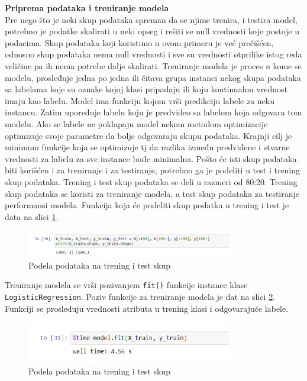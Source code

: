 \documentclass[a4paper,12pt]{report}
\begin{document}
\textbf{Priprema podataka i treniranje modela}\\

Pre nego što je neki skup podataka spreman da se njime trenira, i testira model, potrebno je podatke skalirati u neki opseg i rešiti se null vrednosti koje postoje u podacima. Skup podataka koji koristimo u ovom primeru je već prečišćen, odnosno skup podataka nema null vrednosti i sve su vrednosti otprilike istog reda veličine pa ih nema potrebe dalje skalirati. Treniranje modela je proces u kome se modelu, prosleđuje jedna po jedna ili čitava grupa instanci nekog skupa podataka sa labelama koje su oznake kojoj klasi pripadaju ili koju kontinualnu vrednost imaju kao labelu. Model ima funkciju kojom vrši predikciju labele za neku instancu. Zatim upoređuje labelu koju je predvideo sa labelom koja odgovara tom modelu. Ako se labele ne poklapaju model nekom metodom optimizacije optimizuje svoje parametre da bolje odgovaraju skupu podataka. Krajnji cilj je minimum funkcije koja se optimizuje tj da razlika između predviđene i stvarne vrednosti za labelu za sve instance bude minimalna. Pošto će isti skup podataka biti korišćen i za treniranje i za testiranje, potrebno ga je podeliti u test i trening skup podataka. Trening  i test skup podataka se deli u razmeri od 80:20. Trening skup podataka se koristi za treniranje modela, a test skup podataka za testiranje performansi modela. Funkcija koja će podeliti skup podatka u trening i test je data na slici \ref{fig:irissplit}.

\begin{figure}[h]
    \centering
    \includegraphics[width=0.8\textwidth]{iris_split_dataset.png}
    \caption{Podela podataka na trening i test skup}\label{fig:irissplit}
\end{figure}

Treniranje modela se vrši pozivanjem \texttt{fit()} funkcije instance klase \texttt{LogisticRegression}. Poziv funkcije za treniranje modela je dat na slici \ref{fig:logisticfitcall}. Funkciji se prosleduju vrednosti atributa u trening klasi i odgovarajuće labele. 

\begin{figure}[h]
    \centering
    \includegraphics[width=0.8\textwidth]{logistic_fitcall.png}
    \caption{Podela podataka na trening i test skup}\label{fig:logisticfitcall}
\end{figure}
\end{document}
